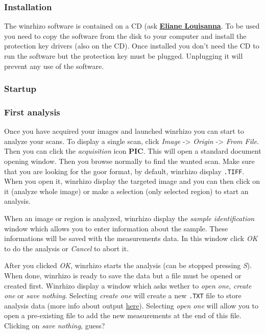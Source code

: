 \documentclass[
  12pt,
  american,
  a4paper,
  extrafontsizes,onecolumn,openright
  ]{memoir}
\begin{document}
\hypertarget{installation}{%
\subsubsection{Installation}\label{installation}}

The winrhizo software is contained on a CD (ask \href{https://docs.google.com/spreadsheets/d/1EqjCVr6w7fykUJtLOVwSNBucNfFGbiYXGlRcoL-s7V8/edit\#gid=0}{\textbf{Eliane Louisanna}}. To be used you need to copy the software from the disk to your computer and install the protection key drivers (also on the CD). Once installed you don't need the CD to run the software but the protection key must be plugged. Unplugging it will prevent any use of the software.

\hypertarget{startup}{%
\subsubsection{Startup}\label{startup}}

\hypertarget{first-analysis}{%
\subsubsection{First analysis}\label{first-analysis}}

Once you have acquired your images and launched winrhizo you can start to analyze your scans. To display a single scan, click \emph{Image} -\textgreater{} \emph{Origin} -\textgreater{} \emph{From File}. Then you can click the \emph{acquisition }icon \textbf{PIC}.
This will open a standard document opening window. Then you browse normally to find the wanted scan. Make sure that you are looking for the goor format, by default, winrhizo display \texttt{.TIFF}.
When you open it, winrhizo display the targeted image and you can then click on it (analyze whole image) or make a selection (only selected region) to start an analysis.

When an image or region is analyzed, winrhizo display the \emph{sample identification} window which allows you to enter information about the sample. These informations will be saved with the measurements data. In this window click \emph{OK} to do the analysis or \emph{Cancel} to abort it.

After you clicked \emph{OK}, winrhizo starts the analysis (can be stopped pressing \emph{S}). When done, winrhizo is ready to save the data but a file must be opened or created first.
Winrhizo display a window which asks wether to \emph{open one}, \emph{create one} or \emph{save nothing}. Selecting \emph{create one} will create a new \texttt{.TXT} file to store analysis data (more info about output \protect\hyperlink{output}{here}). Selecting \emph{open one} will allow you to open a pre-existing file to add the new measurements at the end of this file. Clicking on \emph{save nothing}, guess?
\end{document}
